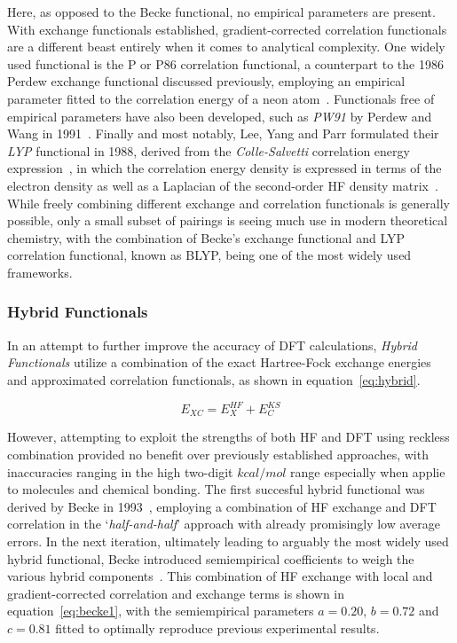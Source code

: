\documentclass[12pt]{article}
\begin{document}
\bigskip

\noindent Here, as opposed to the Becke functional, no empirical parameters are present.
With exchange functionals established, gradient-corrected correlation functionals are a different beast entirely when it comes to analytical complexity.
One widely used functional is the P or P86 correlation functional, a counterpart to the 1986 Perdew exchange functional discussed previously, employing an empirical parameter fitted to the correlation energy of a neon atom~\cite{Perdew1986_2}.
Functionals free of empirical parameters have also been developed, such as \textit{PW91} by Perdew and Wang in 1991~\cite{Burke1998}.
Finally and most notably, Lee, Yang and Parr formulated their \textit{LYP} functional in 1988, derived from the \textit{Colle-Salvetti} correlation energy expression~\cite{Lee1988}, in which the correlation energy density is expressed in terms of the electron density as well as a Laplacian of the second-order HF density matrix~\cite{Colle1975}.
While freely combining different exchange and correlation functionals is generally possible, only a small subset of pairings is seeing much use in modern theoretical chemistry, with the combination of Becke's exchange functional and LYP correlation functional, known as BLYP, being one of the most widely used frameworks.


\subsubsection{Hybrid Functionals}\label{hybrid}

In an attempt to further improve the accuracy of DFT calculations, \textit{Hybrid Functionals} utilize a combination of the exact Hartree-Fock exchange energies and approximated correlation functionals, as shown in equation~\ref{eq:hybrid}.

\begin{equation}
  E_{XC} = E_X^{HF} + E_C^{KS}
  \label{eq:hybrid}
\end{equation}

\bigskip

\noindent However, attempting to exploit the strengths of both HF and DFT using reckless combination provided no benefit over previously established approaches, with inaccuracies ranging in the high two-digit $kcal/mol$ range especially when applie to molecules and chemical bonding.
The first succesful hybrid functional was derived by Becke in 1993~\cite{Becke1993_hybrid}, employing a combination of HF exchange and DFT correlation in the `\textit{half-and-half}' approach with already promisingly low average errors.
In the next iteration, ultimately leading to arguably the most widely used hybrid functional, Becke introduced semiempirical coefficients to weigh the various hybrid components~\cite{Becke1993a}. 
This combination of HF exchange with local and gradient-corrected correlation and exchange terms is shown in equation~\ref{eq:becke1}, with the semiempirical parameters $a=0.20$, $b=0.72$ and $c=0.81$ fitted to optimally reproduce previous experimental results. 
\end{document}
